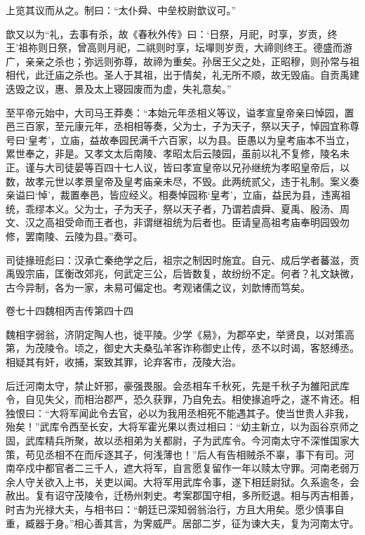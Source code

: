 \documentclass[12pt,UTF8]{ctexbook}
\begin{document}
上览其议而从之。制曰：“太仆舜、中垒校尉歆议可。”



歆又以为“礼，去事有杀，故《春秋外传》曰：‘日祭，月祀，时享，岁贡，终王’祖祢则日祭，曾高则月祀，二祧则时享，坛墠则岁贡，大禘则终王。德盛而游广，亲亲之杀也；弥远则弥尊，故禘为重矣。孙居王父之处，正昭穆，则孙常与祖相代，此迁庙之杀也。圣人于其祖，出于情矣，礼无所不顺，故无毁庙。自贡禹建迭毁之议，惠、景及太上寝园废而为虚，失礼意矣。”



至平帝元始中，大司马王莽奏：“本始元年丞相义等议，谥孝宣皇帝亲曰悼园，置邑三百家，至元康元年，丞相相等奏，父为士，子为天子，祭以天子，悼园宜称尊号曰‘皇考’，立庙，益故奉园民满千六百家，以为县。臣愚以为皇考庙本不当立，累世奉之，非是。又孝文太后南陵、孝昭太后云陵园，虽前以礼不复修，陵名未正。谨与大司徒晏等百四十七人议，皆曰孝宣皇帝以兄孙继统为孝昭皇帝后，以数，故孝元世以孝景皇帝及皇考庙亲未尽，不毁。此两统贰父，违于礼制。案义奏亲谥曰‘悼’，裁置奉邑，皆应经义。相奏悼园称‘皇考’，立庙，益民为县，违离祖统，乖缪本义。父为士，子为天子，祭以天子者，乃谓若虞舜、夏禹、殷汤、周文、汉之高祖受命而王者也，非谓继祖统为后者也。臣请皇高祖考庙奉明园毁勿修，罢南陵、云陵为县。”奏可。



司徒掾班彪曰：汉承亡秦绝学之后，祖宗之制因时施宜。自元、成后学者蕃滋，贡禹毁宗庙，匡衡改郊兆，何武定三公，后皆数复，故纷纷不定。何者？礼文缺微，古今异制，各为一家，未易可偏定也。考观诸儒之议，刘歆博而笃矣。





卷七十四魏相丙吉传第四十四



魏相字弱翁，济阴定陶人也，徙平陵。少学《易》，为郡卒史，举贤良，以对策高第，为茂陵令。顷之，御史大夫桑弘羊客诈称御史止传，丞不以时谒，客怒缚丞。相疑其有奸，收捕，案致其罪，论弃客市，茂陵大治。



后迁河南太守，禁止奸邪，豪强畏服。会丞相车千秋死，先是千秋子为雒阳武库令，自见失父，而相治郡严，恐久获罪，乃自免去。相使掾追呼之，遂不肯还。相独恨曰：“大将军闻此令去官，必以为我用丞相死不能遇其子。使当世贵人非我，殆矣！”武库令西至长安，大将军霍光果以责过相曰：“幼主新立，以为函谷京师之固，武库精兵所聚，故以丞相弟为关都尉，子为武库令。今河南太守不深惟国家大策，苟见丞相不在而斥逐其子，何浅薄也！”后人有告相贼杀不辜，事下有司。河南卒戍中都官者二三千人，遮大将军，自言愿复留作一年以赎太守罪。河南老弱万余人守关欲入上书，关吏以闻。大将军用武库令事，遂下相廷尉狱。久系逾冬，会赦出。复有诏守茂陵令，迁杨州刺史。考案郡国守相，多所贬退。相与丙吉相善，时吉为光禄大夫，与相书曰：“朝廷已深知弱翁治行，方且大用矣。愿少慎事自重，臧器于身。”相心善其言，为霁威严。居部二岁，征为谏大夫，复为河南太守。
\end{document}

